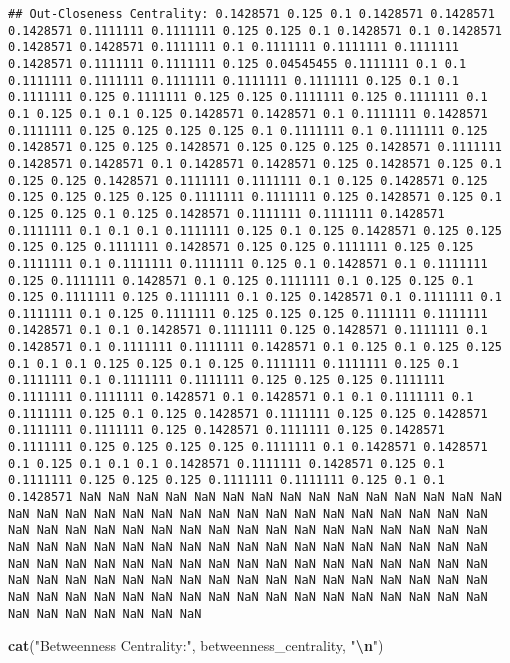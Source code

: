 \documentclass[
]{article}
\newenvironment{Shaded}{\begin{snugshade}}{\end{snugshade}}
\newcommand{\FunctionTok}[1]{\textcolor[rgb]{0.13,0.29,0.53}{\textbf{#1}}}
\newcommand{\NormalTok}[1]{#1}
\newcommand{\SpecialCharTok}[1]{\textcolor[rgb]{0.81,0.36,0.00}{\textbf{#1}}}
\newcommand{\StringTok}[1]{\textcolor[rgb]{0.31,0.60,0.02}{#1}}
\begin{document}
\begin{verbatim}
## Out-Closeness Centrality: 0.1428571 0.125 0.1 0.1428571 0.1428571 0.1428571 0.1111111 0.1111111 0.125 0.125 0.1 0.1428571 0.1 0.1428571 0.1428571 0.1428571 0.1111111 0.1 0.1111111 0.1111111 0.1111111 0.1428571 0.1111111 0.1111111 0.125 0.04545455 0.1111111 0.1 0.1 0.1111111 0.1111111 0.1111111 0.1111111 0.1111111 0.125 0.1 0.1 0.1111111 0.125 0.1111111 0.125 0.125 0.1111111 0.125 0.1111111 0.1 0.1 0.125 0.1 0.1 0.125 0.1428571 0.1428571 0.1 0.1111111 0.1428571 0.1111111 0.125 0.125 0.125 0.125 0.1 0.1111111 0.1 0.1111111 0.125 0.1428571 0.125 0.125 0.1428571 0.125 0.125 0.125 0.1428571 0.1111111 0.1428571 0.1428571 0.1 0.1428571 0.1428571 0.125 0.1428571 0.125 0.1 0.125 0.125 0.1428571 0.1111111 0.1111111 0.1 0.125 0.1428571 0.125 0.125 0.125 0.125 0.125 0.1111111 0.1111111 0.125 0.1428571 0.125 0.1 0.125 0.125 0.1 0.125 0.1428571 0.1111111 0.1111111 0.1428571 0.1111111 0.1 0.1 0.1 0.1111111 0.125 0.1 0.125 0.1428571 0.125 0.125 0.125 0.125 0.1111111 0.1428571 0.125 0.125 0.1111111 0.125 0.125 0.1111111 0.1 0.1111111 0.1111111 0.125 0.1 0.1428571 0.1 0.1111111 0.125 0.1111111 0.1428571 0.1 0.125 0.1111111 0.1 0.125 0.125 0.1 0.125 0.1111111 0.125 0.1111111 0.1 0.125 0.1428571 0.1 0.1111111 0.1 0.1111111 0.1 0.125 0.1111111 0.125 0.125 0.125 0.1111111 0.1111111 0.1428571 0.1 0.1 0.1428571 0.1111111 0.125 0.1428571 0.1111111 0.1 0.1428571 0.1 0.1111111 0.1111111 0.1428571 0.1 0.125 0.1 0.125 0.125 0.1 0.1 0.1 0.125 0.125 0.1 0.125 0.1111111 0.1111111 0.125 0.1 0.1111111 0.1 0.1111111 0.1111111 0.125 0.125 0.125 0.1111111 0.1111111 0.1111111 0.1428571 0.1 0.1428571 0.1 0.1 0.1111111 0.1 0.1111111 0.125 0.1 0.125 0.1428571 0.1111111 0.125 0.125 0.1428571 0.1111111 0.1111111 0.125 0.1428571 0.1111111 0.125 0.1428571 0.1111111 0.125 0.125 0.125 0.125 0.1111111 0.1 0.1428571 0.1428571 0.1 0.125 0.1 0.1 0.1 0.1428571 0.1111111 0.1428571 0.125 0.1 0.1111111 0.125 0.125 0.125 0.1111111 0.1111111 0.125 0.1 0.1 0.1428571 NaN NaN NaN NaN NaN NaN NaN NaN NaN NaN NaN NaN NaN NaN NaN NaN NaN NaN NaN NaN NaN NaN NaN NaN NaN NaN NaN NaN NaN NaN NaN NaN NaN NaN NaN NaN NaN NaN NaN NaN NaN NaN NaN NaN NaN NaN NaN NaN NaN NaN NaN NaN NaN NaN NaN NaN NaN NaN NaN NaN NaN NaN NaN NaN NaN NaN NaN NaN NaN NaN NaN NaN NaN NaN NaN NaN NaN NaN NaN NaN NaN NaN NaN NaN NaN NaN NaN NaN NaN NaN NaN NaN NaN NaN NaN NaN NaN NaN NaN NaN NaN NaN NaN NaN NaN NaN NaN NaN NaN NaN NaN NaN NaN NaN NaN NaN NaN NaN NaN NaN NaN NaN NaN NaN
\end{verbatim}

\begin{Shaded}
\begin{Highlighting}[]
\FunctionTok{cat}\NormalTok{(}\StringTok{"Betweenness Centrality:"}\NormalTok{, betweenness\_centrality, }\StringTok{"}\SpecialCharTok{\textbackslash{}n}\StringTok{"}\NormalTok{)}
\end{Highlighting}
\end{Shaded}
\end{document}
